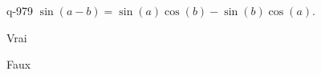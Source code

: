 \begin{truefalse}{q-979}
$\sin(a-b)=\sin(a)\cos(b)-\sin(b)\cos(a)$.
\item* Vrai
\item Faux
\end{truefalse}

